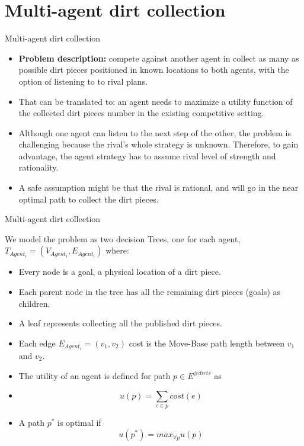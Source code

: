 \documentclass[10pt]{beamer}
\begin{document}
\section{Multi-agent dirt collection}
\begin{frame}{Multi-agent dirt collection}
\begin{itemize}
    \item {\bf Problem description:} compete against another agent in collect as many as possible dirt pieces positioned in known locations to both agents, with the option of listening to to rival plans. 
    \item That can be translated to: an agent needs to maximize a utility function of the collected dirt pieces number in the existing competitive setting.
    \item Although one agent can listen to the next step of the other, the problem is challenging because the rival's whole strategy is unknown. Therefore, to gain advantage, the agent strategy has to assume rival level of strength and rationality.
    \item A safe assumption might be that the rival is rational, and will go in the near optimal path to collect the dirt pieces.
\end{itemize}
\end{frame}


\begin{frame}{Multi-agent dirt collection}

We model the problem as two decision Trees, one for each agent, $T_{Agent_{i}} = (V_{Agent_{i}},E_{Agent_{i}})$ where:
\begin{itemize}
\item Every node is a goal, a physical location of a dirt piece.
\item Each parent node in the tree has all the remaining dirt pieces (goals) as children.
\item A leaf represents collecting all the published dirt pieces.
\item Each edge $E_{Agent_{i}}=(v_{1},v_{2})$ cost is the Move-Base path length between $v_{1}$ and $v_{2}$.
\item The utility of an agent is defined for path $p\in E^{\# dirts}$ as
\item $$u(p) = \sum_{e \in p} cost(e) $$
\item A path $p^{*}$ is optimal if $$u(p^{*}) = max_{\forall p}{u(p)} $$
\end{itemize}
\end{frame}
\end{document}
